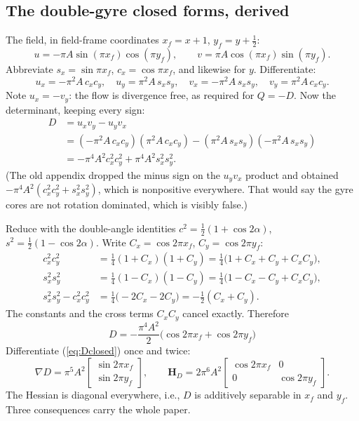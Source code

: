 \documentclass[11pt]{article}
\begin{document}
\subsection{The double-gyre closed forms, derived}

The field, in field-frame coordinates $x_f = x + 1$, $y_f = y + \tfrac12$:
\begin{equation}
u = -\pi A \sin(\pi x_f)\cos(\pi y_f), \qquad
v = \pi A \cos(\pi x_f)\sin(\pi y_f) .
\end{equation}
Abbreviate $s_x = \sin\pi x_f$, $c_x = \cos\pi x_f$, and likewise for $y$.
Differentiate:
\begin{equation}
u_x = -\pi^2 A\, c_x c_y, \quad
u_y = \pi^2 A\, s_x s_y, \quad
v_x = -\pi^2 A\, s_x s_y, \quad
v_y = \pi^2 A\, c_x c_y .
\end{equation}
Note $u_x = -v_y$: the flow is divergence free, as required for $Q = -D$.
Now the determinant, keeping every sign:
\begin{align}
D &= u_x v_y - u_y v_x \\
  &= (-\pi^2 A\, c_x c_y)(\pi^2 A\, c_x c_y)
     - (\pi^2 A\, s_x s_y)(-\pi^2 A\, s_x s_y) \\
  &= -\pi^4 A^2 c_x^2 c_y^2 + \pi^4 A^2 s_x^2 s_y^2 .
\end{align}
(The old appendix dropped the minus sign on the $u_yv_x$ product and obtained
$-\pi^4A^2(c_x^2c_y^2 + s_x^2s_y^2)$, which is nonpositive everywhere. That
would say the gyre cores are not rotation dominated, which is visibly false.)

Reduce with the double-angle identities
$c^2 = \tfrac{1}{2}(1 + \cos 2\alpha)$,
$s^2 = \tfrac{1}{2}(1 - \cos 2\alpha)$.
Write $C_x = \cos 2\pi x_f$, $C_y = \cos 2\pi y_f$:
\begin{align}
c_x^2 c_y^2 &= \tfrac{1}{4}(1 + C_x)(1 + C_y)
             = \tfrac{1}{4}\bigl(1 + C_x + C_y + C_xC_y\bigr), \\
s_x^2 s_y^2 &= \tfrac{1}{4}(1 - C_x)(1 - C_y)
             = \tfrac{1}{4}\bigl(1 - C_x - C_y + C_xC_y\bigr), \\
s_x^2 s_y^2 - c_x^2 c_y^2 &= \tfrac{1}{4}\bigl(-2C_x - 2C_y\bigr)
             = -\tfrac{1}{2}(C_x + C_y) .
\end{align}
The constants and the cross terms $C_xC_y$ cancel exactly. Therefore
\begin{equation}
\boxed{\;D = -\frac{\pi^4 A^2}{2}\bigl(\cos 2\pi x_f + \cos 2\pi y_f\bigr)\;}
\label{eq:Dclosed}
\end{equation}
Differentiate (\ref{eq:Dclosed}) once and twice:
\begin{equation}
\nabla D = \pi^5 A^2
\begin{bmatrix} \sin 2\pi x_f \\ \sin 2\pi y_f \end{bmatrix},
\qquad
\mathbf{H}_D = 2\pi^6 A^2
\begin{bmatrix} \cos 2\pi x_f & 0 \\ 0 & \cos 2\pi y_f \end{bmatrix}.
\label{eq:gradHclosed}
\end{equation}
The Hessian is diagonal everywhere, i.e., $D$ is additively separable in
$x_f$ and $y_f$. Three consequences carry the whole paper.
\end{document}
